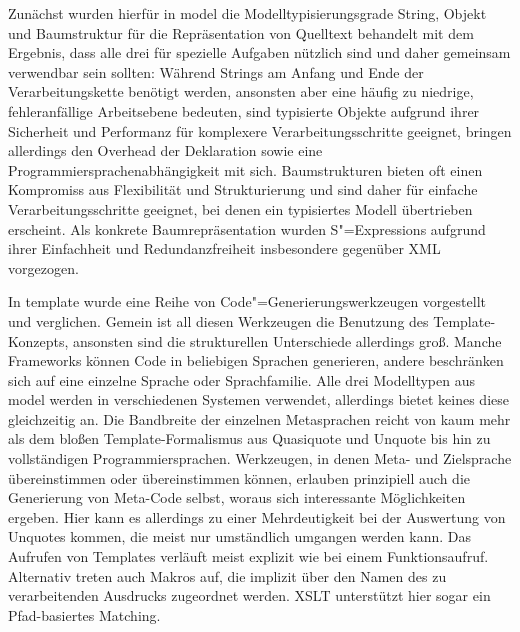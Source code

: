 \documentclass[11pt, a4paper, bibgerm]{scrbook}
\newcommand\cref{}
\newcommand{\sexps}{S"=Expressions}
\newcommand{\cgen}{Code"=Generierung}
\begin{document}
Zunächst wurden hierfür in \cref{model} die Modelltypisierungsgrade
String, Objekt und Baumstruktur für die Repräsentation von Quelltext
behandelt mit dem Ergebnis, dass alle drei für spezielle Aufgaben
nützlich sind und daher gemeinsam verwendbar sein sollten: Während
Strings am Anfang und Ende der Verarbeitungskette benötigt werden,
ansonsten aber eine häufig zu niedrige, fehleranfällige Arbeitsebene
bedeuten, sind typisierte Objekte aufgrund ihrer Sicherheit und
Performanz für komplexere Verarbeitungsschritte geeignet, bringen
allerdings den Overhead der Deklaration sowie eine
Programmiersprachenabhängigkeit mit sich. Baumstrukturen bieten oft
einen Kompromiss aus Flexibilität und Strukturierung und sind daher für
einfache Verarbeitungsschritte geeignet, bei denen ein typisiertes
Modell übertrieben erscheint. Als konkrete Baumrepräsentation wurden
\sexps{} aufgrund ihrer Einfachheit und Redundanzfreiheit insbesondere
gegenüber XML vorgezogen.

In \cref{template} wurde eine Reihe von \cgen{}swerkzeugen vorgestellt
und verglichen. Gemein ist all diesen Werkzeugen die Benutzung des
Template-Konzepts, ansonsten sind die strukturellen Unterschiede
allerdings groß. Manche Frameworks können Code in beliebigen Sprachen
generieren, andere beschränken sich auf eine einzelne Sprache oder
Sprachfamilie. Alle drei Modelltypen aus \cref{model} werden in
verschiedenen Systemen verwendet, allerdings bietet keines diese
gleichzeitig an. Die Bandbreite der einzelnen Metasprachen reicht von
kaum mehr als dem bloßen Template-Formalismus aus Quasiquote und Unquote
bis hin zu vollständigen Programmiersprachen. Werkzeugen, in denen Meta- und
Zielsprache übereinstimmen oder übereinstimmen können, erlauben
prinzipiell auch die Generierung von Meta-Code selbst, woraus sich
interessante Möglichkeiten ergeben. Hier kann es allerdings zu einer
Mehrdeutigkeit bei der Auswertung von Unquotes kommen, die meist nur
umständlich umgangen werden kann. Das Aufrufen von Templates verläuft
meist explizit wie bei einem Funktionsaufruf. Alternativ treten auch
Makros auf, die implizit über den Namen des zu verarbeitenden Ausdrucks
zugeordnet werden. XSLT unterstützt hier sogar ein Pfad-basiertes
Matching.
\end{document}
